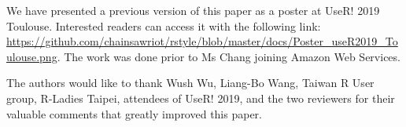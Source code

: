  We have presented a previous version of this paper as a poster at UseR! 2019 Toulouse. Interested readers can access it with the following link: \url{
    https://github.com/chainsawriot/rstyle/blob/master/docs/Poster_useR2019_Toulouse.png}. The work was done prior to Ms Chang joining Amazon Web Services.


The authors would like to thank Wush Wu, Liang-Bo Wang, Taiwan R User group, R-Ladies Taipei, attendees of UseR! 2019, and the two reviewers for their valuable comments that greatly improved this paper.



\newpage
\address{Chia-Yi Yen\\
  Mannheim Business School, Universit\"at Mannheim\\
  L 5, 6, 68131 Mannheim\\
  Germany\\
  \url{https://orcid.org/0000-0003-1209-7789}\\
  }

\address{Mia Huai-Wen Chang\\
  Amazon Web Services\\
  Marcel-Breuer-Stra{\ss}e 12, 80807 M\"unchen\\
  Germany\\
  }

\address{Chung-hong Chan\\
  Mannheimer Zentrum f\"ur Europ\"aische Sozialforschung, Universit\"at Mannheim\\
  A5, 6,  68159 Mannheim\\
  Germany\\
  \url{https://orcid.org/0000-0002-6232-7530}\\
  }

